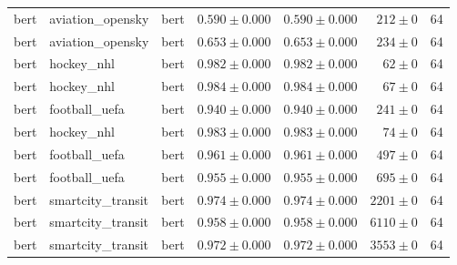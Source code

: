 \begin{table}[htbp]
\begin{tabular}{l l l r r r r}
bert & aviation\_opensky & bert & $0.590\pm0.000$ & $0.590\pm0.000$ & $212\pm0$ & 64 \\
bert & aviation\_opensky & bert & $0.653\pm0.000$ & $0.653\pm0.000$ & $234\pm0$ & 64 \\
bert & hockey\_nhl & bert & $0.982\pm0.000$ & $0.982\pm0.000$ & $62\pm0$ & 64 \\
bert & hockey\_nhl & bert & $0.984\pm0.000$ & $0.984\pm0.000$ & $67\pm0$ & 64 \\
bert & football\_uefa & bert & $0.940\pm0.000$ & $0.940\pm0.000$ & $241\pm0$ & 64 \\
bert & hockey\_nhl & bert & $0.983\pm0.000$ & $0.983\pm0.000$ & $74\pm0$ & 64 \\
bert & football\_uefa & bert & $0.961\pm0.000$ & $0.961\pm0.000$ & $497\pm0$ & 64 \\
bert & football\_uefa & bert & $0.955\pm0.000$ & $0.955\pm0.000$ & $695\pm0$ & 64 \\
bert & smartcity\_transit & bert & $0.974\pm0.000$ & $0.974\pm0.000$ & $2201\pm0$ & 64 \\
bert & smartcity\_transit & bert & $0.958\pm0.000$ & $0.958\pm0.000$ & $6110\pm0$ & 64 \\
bert & smartcity\_transit & bert & $0.972\pm0.000$ & $0.972\pm0.000$ & $3553\pm0$ & 64 \\
\hline
\end{tabular}
\end{table}
